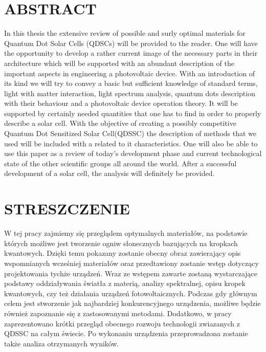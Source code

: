 \documentclass[12pt,twoside]{report}
\numberwithin{equation}{subsection}
\begin{document}
\graphicspath{ {images/} }

\newpage

\begingroup

\let\clearpage\relax
\chapter*{\textbf{ABSTRACT}}

In this thesis the extensive review of possible and surly optimal materials for Quantum Dot Solar Cells (QDSCs) will be provided to the reader. One will have the opportunity to develop a rather current image of the necessary parts in their architecture which will be supported with an abundant description of the important aspects in engineering a photovoltaic device. With an introduction of its kind we will try to convey a basic but sufficient knowledge of standard terms, light with matter interaction, light spectrum analysis, quantum dots description with their behaviour and a photovoltaic device operation theory. It will be supported by certainly needed quantities that one has to find in order to properly describe a solar cell. With the objective of creating a possibly competitive Quantum Dot Sensitized Solar Cell(QDSSC) the description of methods that we used will be included with a related to it characteristics. One will also be able to use this paper as a review of today's development phase and current technological state of the other scientific groups all around the world.  After a successful development of a solar cell, the analysis will definitely be provided.

\chapter*{STRESZCZENIE}

W tej pracy zajmiemy się przeglądem optymalnych materiałów, na podstawie których możliwe jest tworzenie ogniw słonecznych bazujących na kropkach kwantowych. Dzięki temu pokazany zostanie obecny obraz zawierający opis wspomnianych wcześniej materiałów oraz przedtawiony zostanie wstęp dotyczący projektowania tychże urządzeń. Wraz ze wstępem zawarte zostaną wystarczające podstawy oddziaływania światła z materią, analizy spektralnej, opisu kropek kwantowych, czy też działania urządzeń fotowoltaicznych. Podczas gdy głównym celem jest stworzenie jak najbardziej konkurencyjnego urządzenia, możliwe będzie również zapoznanie się z zastosowanymi metodami. Dodatkowo, w pracy zaprezentowano krótki przegląd obecnego rozwoju technologii zwiazanych z QDSSC na całym świecie. Po wykonaniu urządzenia przeprowadzona zostanie także analiza otrzymanych wyników.
\end{document}
